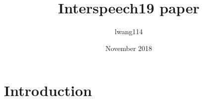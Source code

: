 \documentclass{article}
\title{Interspeech19 paper}
\author{lwang114}
\date{November 2018}
\begin{document}
\maketitle

\section{Introduction}
\end{document}
